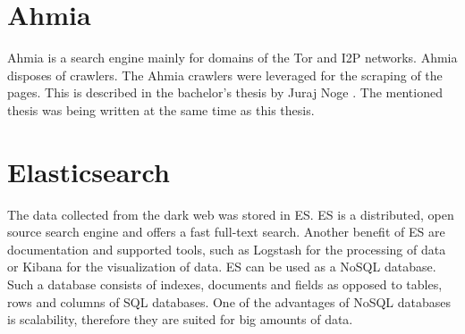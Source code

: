 \section{Ahmia} \label{ahmia}
Ahmia is a search engine mainly for domains of the Tor and I2P networks. Ahmia disposes of crawlers. The Ahmia crawlers were leveraged for the scraping of the pages. This is described in the bachelor's thesis by Juraj Noge \cite{bcScraping}. The mentioned thesis was being written at the same time as this thesis.

\section{Elasticsearch}  \label{Elasticsearch}
The data collected from the dark web was stored in ES. ES is a distributed, open source search engine \cite{elasticSearch} and offers a fast full-text search. Another benefit of ES are documentation and supported tools, such as Logstash \cite{logstash} for the processing of data or Kibana \cite{kibana} for the visualization of data. ES can be used as a NoSQL database. Such a database consists of indexes, documents and fields as opposed to tables, rows and columns of SQL databases.  One of the advantages of NoSQL databases is scalability, therefore they are suited for big amounts of data. 